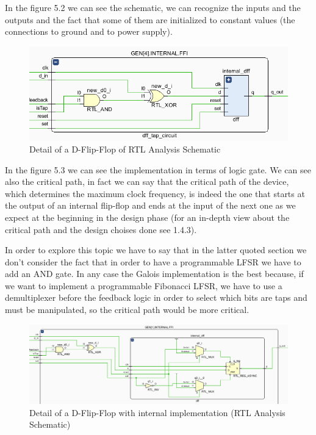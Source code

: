 \documentclass[a4paper]{report}
\begin{document}
\noindent In the figure 5.2 we can see the schematic, we can recognize the inputs and the outputs and the fact that some of them are initialized to constant values (the connections to ground and to power supply).

\begin{figure}[htpb]
	\centering
	\includegraphics[scale=0.7]{img/vivado/detail_of_rtl_analysis.png}
	\caption{Detail of a D-Flip-Flop of RTL Analysis Schematic}
\end{figure}

\noindent In the figure 5.3 we can see the implementation in terms of logic gate. We can see also the critical path, in fact we can say that the critical path of the device, which determines the maximum clock frequency, is indeed the one that starts at the output of an internal flip-flop and ends at the input of the next one as we expect at the beginning in the design phase (for an in-depth view about the critical path and the design choises done see 1.4.3).

\noindent In order to explore this topic we have to say that in the latter quoted section we don't consider the fact that in order to have a programmable LFSR we have to add an AND gate. In any case the Galois implementation is the best because, if we want to implement a programmable Fibonacci LFSR, we have to use a demultiplexer before the feedback logic in order to select which bits are taps and must be manipulated, so the critical path would be more critical.

\begin{figure}[htpb]
	\centering
	\includegraphics[scale=0.55]{img/vivado/detail_of_detail_of_rtl_analysis.png}
	\caption{Detail of a D-Flip-Flop with internal implementation (RTL Analysis Schematic)}
\end{figure}
\end{document}
